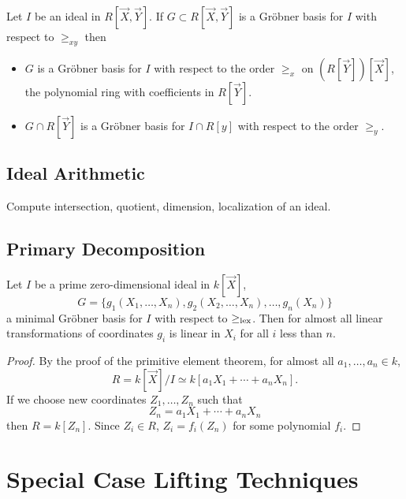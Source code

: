 \begin{proposition}
\label{Lexical:Grobner:Prop}
Let $I$ be an ideal in $R[\vec X, \vec Y]$.  If $G \subset R[\vec X,
\vec Y]$ is a Gr\"obner basis for $I$ with respect to $\ge_{xy}$ then 
\begin{itemize}
\item $G$ is a Gr\"obner basis for $I$ with respect to the order
$\ge_x$ on $(R[\vec Y])[\vec X]$, the polynomial ring with coefficients
in $R[\vec Y]$.
\item $G\cap R[\vec Y]$ is a Gr\"obner basis for $I\cap R[y]$ with
respect to the order $\ge_{y}$.
\end{itemize}
\end{proposition}


\subsection{Ideal Arithmetic}
\label{Ideal:Arithmetic:Sec}

Compute intersection, quotient, dimension, localization of an ideal.

\subsection{Primary Decomposition}

\begin{proposition}
Let $I$ be a prime zero-dimensional ideal in $k[\vec X]$, 
\[
G = \{g_1(X_1, \ldots, X_n), g_2(X_2, \ldots, X_n), \ldots, g_n(X_n)\}
\]
a minimal Gr\"obner basis for $I$ with respect to $\ge_{\rm lex}$.  Then for
almost all linear transformations of coordinates $g_i$ is linear in
$X_i$ for all $i$ less than $n$.
\end{proposition}

\begin{proof}
By the proof of the primitive element theorem, for almost all $a_1,
\ldots, a_n \in k$,
\[
R = k[\vec X]/I \simeq k[a_1 X_1 + \cdots + a_n X_n].
\]
If we choose new coordinates $Z_1, \ldots, Z_n$ such that 
\[
Z_n = a_1 X_1 + \cdots + a_n X_n
\]
then $R = k[Z_n]$.  Since $Z_i \in R$, $Z_i = f_i(Z_n)$ for some
polynomial $f_i$.
\end{proof}

\section{Special Case Lifting Techniques}



